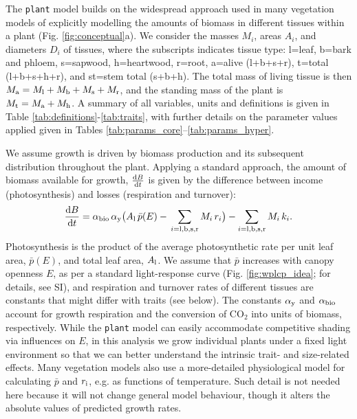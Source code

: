 \documentclass[9pt,twocolumn,twoside]{pnas-new}
\newcommand{\plant}{\texttt{plant}}
\begin{document}
The {\plant} model builds on the widespread approach used in many vegetation models of explicitly modelling the amounts of biomass in different tissues within a plant \citep[e.g.][]{Givnish-1988, Makela-1997, Moorcroft-2001, Sitch-2008, Falster-2011, King-2011, DeKauwe-2014} (Fig. \ref{fig:conceptual}a). We consider the masses $M_i$, areas $A_i$, and diameters $D_i$ of tissues, where the subscripts indicates tissue type: l=leaf, b=bark and phloem, s=sapwood, h=heartwood, r=root, a=alive (l+b+s+r), t=total (l+b+s+h+r), and st=stem total (s+b+h). The total mass of living tissue is then $M_{\rm a}=M_{\rm l}+M_{\rm b}+M_{\rm s}+M_{\rm r}$, and the standing mass of the plant is $M_{\rm t}=M_{\rm a}+M_{\rm h}$. A summary of all variables, units and definitions is given in Table \ref{tab:definitions}-\ref{tab:traits}, with further details on the parameter values applied given in Tables \ref{tab:params_core}--\ref{tab:params_hyper}.

We assume growth is driven by biomass production and its subsequent distribution throughout the plant. Applying a standard approach, the amount of biomass available for growth, $\frac{{\rm d}B}{{\rm d}t}$ is given by the difference between income (photosynthesis) and losses (respiration and turnover)\citep{Makela-1997, Thornley-2000}:
\begin{equation}\label{eq:dbdt}
\frac{{\rm d}B}{{\rm d}t}
= \alpha_{\rm bio} \,
\alpha_{\rm y}
\big( A_{\rm l} \, \bar{p}(E) -
\, \sum_{i = {\rm l}, {\rm b}, {\rm s}, {\rm r}}{M_i \, r_i}\big)
- \sum_{i = {\rm l}, {\rm b}, {\rm s},  {\rm r}}{M_i \, k_i}.
\end{equation}
Photosynthesis is the product of the average photosynthetic rate per unit leaf area, $\bar{p}(E)$, and total leaf area, $A_{\rm l}$. We assume that $\bar{p}$ increases with canopy openness $E$, as per a standard light-response curve (Fig. \ref{fig:wplcp_idea}; for details, see SI), and respiration and turnover rates of different tissues are constants that might differ with traits (see below). The constants $\alpha_{\rm y}$ and $\alpha_{\rm bio}$ account for growth respiration and the conversion of CO$_2$ into units of biomass, respectively. While the {\plant} model can easily accommodate competitive shading via influences on $E$, in this analysis we grow individual plants under a fixed light environment so that we can better understand the intrinsic trait- and size-related effects. Many vegetation models also use a more-detailed physiological model for calculating $\bar{p}$ and $r_{\rm i}$, e.g. as functions of temperature. Such detail is not needed here because it will not change general model behaviour, though it alters the absolute values of predicted growth rates. 
\end{document}
